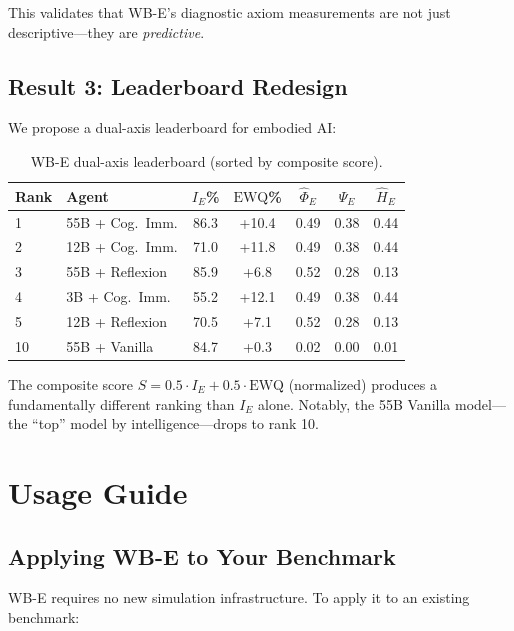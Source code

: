 \documentclass{article}
\newcommand{\EWQ}{\mathrm{EWQ}}
\begin{document}
This validates that WB-E's diagnostic axiom measurements are not just descriptive---they are \emph{predictive}.

\subsection{Result 3: Leaderboard Redesign}

We propose a dual-axis leaderboard for embodied AI:

\begin{table}[t]
\centering
\caption{WB-E dual-axis leaderboard (sorted by composite score).}
\label{tab:leaderboard}
\begin{tabular}{llccccc}
\toprule
\textbf{Rank} & \textbf{Agent} & $I_E$\% & $\EWQ$\% & $\hat{\Phi}_E$ & $\hat{\Psi}_E$ & $\hat{H}_E$ \\
\midrule
1 & 55B + Cog.\ Imm. & 86.3 & +10.4 & 0.49 & 0.38 & 0.44 \\
2 & 12B + Cog.\ Imm. & 71.0 & +11.8 & 0.49 & 0.38 & 0.44 \\
3 & 55B + Reflexion  & 85.9 & +6.8 & 0.52 & 0.28 & 0.13 \\
4 & 3B + Cog.\ Imm.  & 55.2 & +12.1 & 0.49 & 0.38 & 0.44 \\
5 & 12B + Reflexion  & 70.5 & +7.1 & 0.52 & 0.28 & 0.13 \\
\midrule
10 & 55B + Vanilla    & 84.7 & +0.3 & 0.02 & 0.00 & 0.01 \\
\bottomrule
\end{tabular}
\end{table}

The composite score $S = 0.5 \cdot I_E + 0.5 \cdot \EWQ$ (normalized) produces a fundamentally different ranking than $I_E$ alone.
Notably, the 55B Vanilla model---the ``top'' model by intelligence---drops to rank 10.

\section{Usage Guide}
\label{sec:usage}

\subsection{Applying WB-E to Your Benchmark}

WB-E requires no new simulation infrastructure.
To apply it to an existing benchmark:
\end{document}

